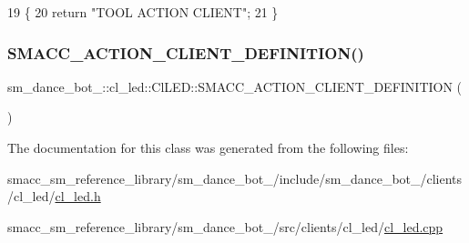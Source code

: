 \begin{DoxyCode}
19 \{
20     \textcolor{keywordflow}{return} \textcolor{stringliteral}{"TOOL ACTION CLIENT"};
21 \}
\end{DoxyCode}
\mbox{\label{classsm__dance__bot__2_1_1cl__led_1_1ClLED_aa90e141f886853f8277b8db254fa981c}} 
\subsubsection{\texorpdfstring{S\+M\+A\+C\+C\+\_\+\+A\+C\+T\+I\+O\+N\+\_\+\+C\+L\+I\+E\+N\+T\+\_\+\+D\+E\+F\+I\+N\+I\+T\+I\+O\+N()}{SMACC\_ACTION\_CLIENT\_DEFINITION()}}
{\footnotesize\ttfamily sm\+\_\+dance\+\_\+bot\+\_\+::cl\+\_\+led\+::\+Cl\+L\+E\+D\+::\+S\+M\+A\+C\+C\+\_\+\+A\+C\+T\+I\+O\+N\+\_\+\+C\+L\+I\+E\+N\+T\+\_\+\+D\+E\+F\+I\+N\+I\+T\+I\+ON (\begin{DoxyParamCaption}\item[{sm\+\_\+dance\+\_\+bot\+\_\+2\+::\+L\+E\+D\+Control\+Action}]{ }\end{DoxyParamCaption})}



The documentation for this class was generated from the following files\+:\begin{DoxyCompactItemize}
\item 
smacc\+\_\+sm\+\_\+reference\+\_\+library/sm\+\_\+dance\+\_\+bot\+\_/include/sm\+\_\+dance\+\_\+bot\+\_/clients/cl\+\_\+led/\hyperlink{2_2include_2sm__dance__bot__2_2clients_2cl__led_2cl__led_8h}{cl\+\_\+led.\+h}\item 
smacc\+\_\+sm\+\_\+reference\+\_\+library/sm\+\_\+dance\+\_\+bot\+\_/src/clients/cl\+\_\+led/\hyperlink{2_2src_2clients_2cl__led_2cl__led_8cpp}{cl\+\_\+led.\+cpp}\end{DoxyCompactItemize}
